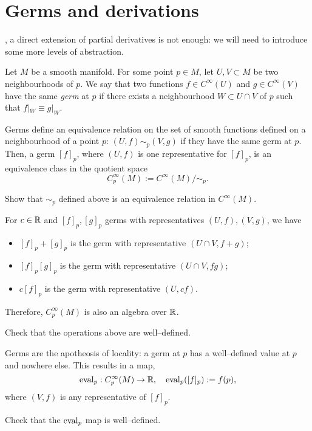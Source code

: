 \section{Germs and derivations}

, a direct extension of partial derivatives is not enough: we will need to introduce some more levels of abstraction.

\begin{definition}
  Let $M$ be a smooth manifold.
  For some point $p\in M$, let $U,V\subset M$ be two neighbourhoods of $p$.
  We say that two functions $f\in C^\infty(U)$ and $g\in C^\infty(V)$ have the same \emph{germ} at $p$ if there exists a neighbourhood $W\subset U\cap V$ of $p$ such that $f|_W \equiv g|_W$.
\end{definition}

Germs define an equivalence relation on the set of smooth functions defined on a neighbourhood of a point $p$: $(U, f) \sim_p (V, g)$ if they have the same germ at $p$. Then, a germ $[f]_p$, where $(U, f)$ is one representative for $[f]_p$, is an equivalence class in the quotient space 
\begin{equation}
  C_p^\infty(M) := C^\infty(M)/\!\sim_p.
\end{equation} 

\begin{exercise}
  Show that $\sim_p$ defined above is an equivalence relation in $C^\infty(M)$.
\end{exercise}

For $c\in\mathbb{R}$ and $[f]_p, [g]_p$ germs with representatives $(U, f), (V, g)$, we have
\begin{itemize}
  \item $[f]_p + [g]_p$ is the germ with representative $(U\cap V, f+g)$;
  \item $[f]_p [g]_p$ is the germ with representative $(U\cap V, f g)$;
  \item $c[f]_p$ is the germ with representative $(U, cf)$.
\end{itemize}
Therefore, $C_p^\infty(M)$ is also an algebra over $\mathbb{R}$.

\begin{exercise}
  Check that the operations above are well--defined.
\end{exercise}

Germs are the apotheosis of locality: a germ at $p$ has a well--defined value at $p$ and nowhere else.
This results in a map,
\begin{equation}
  \operatorname{eval}_p: C_p^\infty(M) \to \mathbb{R}, \quad
  \operatorname{eval}_p([f]_p) := f(p),
\end{equation}
where $(V,f)$ is any representative of $[f]_p$.
\begin{exercise}
  Check that the $\operatorname{eval}_p$ map is well--defined.
\end{exercise}

